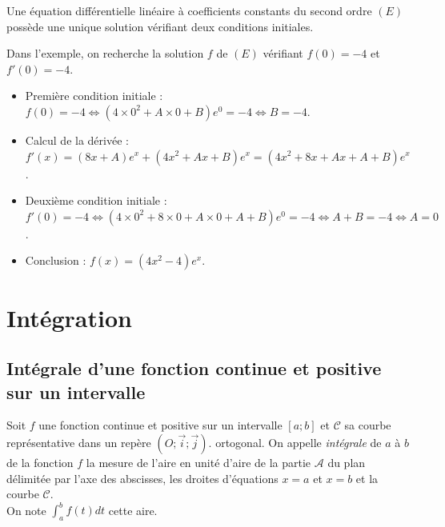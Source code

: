 \documentclass[french]{book}
\begin{document}
\begin{thm}
Une équation différentielle linéaire à coefficients constants du second ordre $(E)$ possède une unique solution vérifiant deux conditions initiales.
\end{thm}

\begin{exemple}
Dans l'exemple, on recherche la solution $f$ de $(E)$ vérifiant $f(0) =-4$ et $f'(0) =-4$.
\begin{itemize}
   \item Première condition initiale : \\
   \hspace*{0.3cm} $f(0) =-4 \Longleftrightarrow (4\times0^2+A\times0+B)e^0 =-4 \Longleftrightarrow B =-4$.
   \item Calcul de la dérivée : \\
   \hspace*{0.3cm} $f'(x) =(8x+A)e^x+(4x^2+Ax+B)e^x =(4x^2+8x+Ax+A+B)e^x$.
   \item Deuxième condition initiale : \\
   \hspace*{0.3cm} $f'(0) =-4 \Longleftrightarrow (4\times0^2+8\times0+A\times0+A+B)e^0 =-4 \Longleftrightarrow A+B =-4 \Longleftrightarrow A =0$.
   \item Conclusion : 
   \hspace*{0.3cm} $f(x) =(4x^2-4)e^x$.
\end{itemize}
\end{exemple}

\chapter{Intégration}
\section{Intégrale d'une fonction continue et positive sur un intervalle}

\begin{defn}
 Soit $f$ une fonction continue et positive sur un intervalle $[a;b]$ et $\mathcal{C}$ sa courbe représentative dans un repère $(O;\vec{i};\vec{j})$. ortogonal.
On appelle \emph{intégrale} de $a$ à $b$ de la fonction $f$ la mesure de l'aire en unité d'aire de la partie $\mathcal{A}$ du plan délimitée par l'axe des abscisses, les droites d'équations $x=a$ et $x=b$ et la courbe $\mathcal{C}$.\\
On note $\int_{a}^{b}f(t)dt$ cette aire.
\end{defn}
\end{document}
